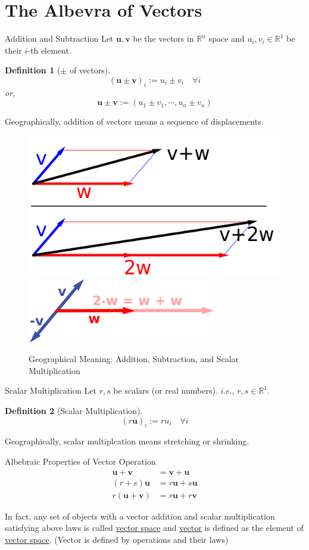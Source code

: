 \documentclass[a4paper,11pt]{article}
\newtheorem{defn}{Definition}
\begin{document}

\section{The Albevra of Vectors} %
\label{sec:the_albevra_of_vectors}
\begin{frame}[t]{Addition and Subtraction}
	Let $\mathbf{u,v}$ be the vectors in $\mathbb{R}^n$ space and $u_i,v_i\in\mathbb{R}^1$ be their $i$-th element. 
	\begin{defn}
		[$\pm$ of vectors]
		\[
			(\mathbf{u\pm v})_i := u_i \pm v_i \quad \forall i
		\] or, \[
			\mathbf{u\pm v} := (u_1 \pm v_1, \cdots , u_n\pm v_n)
		\]
	\end{defn}
	Geographically, addition of vectors means a sequence of displacements. 
	\begin{figure}[ht]
	  \centering
	    \includegraphics[width=.3\textwidth]{_img/Vector_add_scale.svg.png}
		\includegraphics[width=.3\textwidth]{_img/Scalar_multiplication.svg.png}
	  \caption{Geographical Meaning: Addition, Subtraction, and Scalar Multiplication}
	  \label{fig:_img_Vector_add_scale.svg}	
	\end{figure}
	
\end{frame}

\begin{frame}[t]{Scalar Multiplication}
	Let $r,s$ be scalars (or real numbers). $i.e.$, $r,s\in \mathbb{R}^1$.
	\begin{defn}
		[Scalar Multiplication]
		\[
			(r\mathbf{u})_i:= ru_i \quad\forall i
		\]
	\end{defn}
	Geographically, scalar multiplcation means stretching or shrinking.
	
	\begin{block}
		{Albebraic Properties of Vector Operation}
		\begin{align*}
			\mathbf{u+v} &= \mathbf{v+u} \tag{Commutative Law}\\
			(r+s)\mathbf{u} &= r\mathbf{u}+s\mathbf{u} \tag{Destributive Law 1}\\
			r(\mathbf{u+v}) &= r\mathbf{u}+r\mathbf{v} \tag{Destributive Law 2}
		\end{align*}
	\end{block}
	In fact, any set of objects with a vector addition and scalar multiplication satisfying above laws is called \uline{vector space} and \uline{vector} is defined as the element of \uline{vector space}. (Vector is defined by operations and their laws)
\end{frame}
\end{document}
